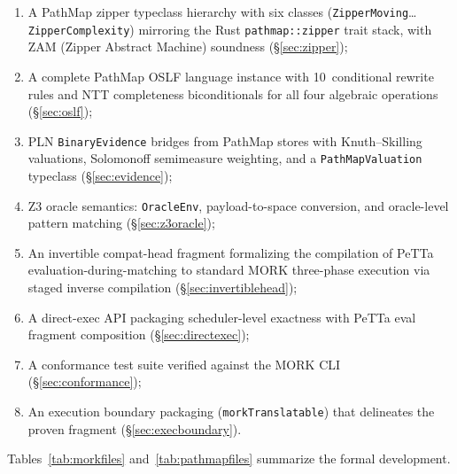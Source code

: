 \documentclass[11pt]{article}
\theoremstyle{definition}
\theoremstyle{remark}
\newcommand{\MORK}{\textup{MORK}}
\newcommand{\PathMap}{\textup{PathMap}}
\begin{document}
\begin{enumerate}[nosep]
        corresponds to \texttt{CommReduction} (\S\ref{sec:mqbridge});
  \item A \PathMap{} zipper typeclass hierarchy with six classes
        (\texttt{ZipperMoving}\ldots\texttt{ZipperComplexity}) mirroring
        the Rust \texttt{pathmap::zipper} trait stack, with ZAM
        (Zipper Abstract Machine) soundness (\S\ref{sec:zipper});
  \item A complete \PathMap{} OSLF language instance with 10~conditional
        rewrite rules and NTT completeness biconditionals for all four
        algebraic operations (\S\ref{sec:oslf});
  \item PLN \texttt{BinaryEvidence} bridges from \PathMap{} stores with
        Knuth--Skilling valuations, Solomonoff semimeasure weighting,
        and a \texttt{PathMapValuation} typeclass (\S\ref{sec:evidence});
  \item Z3 oracle semantics: \texttt{OracleEnv}, payload-to-space
        conversion, and oracle-level pattern matching (\S\ref{sec:z3oracle});
  \item An invertible compat-head fragment formalizing the compilation
        of PeTTa evaluation-during-matching to standard MORK three-phase
        execution via staged inverse compilation (\S\ref{sec:invertiblehead});
  \item A direct-exec API packaging scheduler-level exactness with
        PeTTa eval fragment composition (\S\ref{sec:directexec});
  \item A conformance test suite verified against the \MORK{} CLI
        (\S\ref{sec:conformance});
  \item An execution boundary packaging (\texttt{morkTranslatable}) that
        delineates the proven fragment (\S\ref{sec:execboundary}).
\end{enumerate}

\noindent
Tables~\ref{tab:morkfiles} and~\ref{tab:pathmapfiles} summarize the
formal development.
\end{document}
